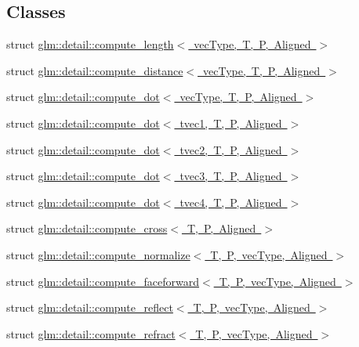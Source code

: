 \subsection*{Classes}
\begin{DoxyCompactItemize}
\item 
struct \mbox{\hyperlink{structglm_1_1detail_1_1compute__length}{glm\+::detail\+::compute\+\_\+length$<$ vec\+Type, T, P, Aligned $>$}}
\item 
struct \mbox{\hyperlink{structglm_1_1detail_1_1compute__distance}{glm\+::detail\+::compute\+\_\+distance$<$ vec\+Type, T, P, Aligned $>$}}
\item 
struct \mbox{\hyperlink{structglm_1_1detail_1_1compute__dot}{glm\+::detail\+::compute\+\_\+dot$<$ vec\+Type, T, P, Aligned $>$}}
\item 
struct \mbox{\hyperlink{structglm_1_1detail_1_1compute__dot_3_01tvec1_00_01_t_00_01_p_00_01_aligned_01_4}{glm\+::detail\+::compute\+\_\+dot$<$ tvec1, T, P, Aligned $>$}}
\item 
struct \mbox{\hyperlink{structglm_1_1detail_1_1compute__dot_3_01tvec2_00_01_t_00_01_p_00_01_aligned_01_4}{glm\+::detail\+::compute\+\_\+dot$<$ tvec2, T, P, Aligned $>$}}
\item 
struct \mbox{\hyperlink{structglm_1_1detail_1_1compute__dot_3_01tvec3_00_01_t_00_01_p_00_01_aligned_01_4}{glm\+::detail\+::compute\+\_\+dot$<$ tvec3, T, P, Aligned $>$}}
\item 
struct \mbox{\hyperlink{structglm_1_1detail_1_1compute__dot_3_01tvec4_00_01_t_00_01_p_00_01_aligned_01_4}{glm\+::detail\+::compute\+\_\+dot$<$ tvec4, T, P, Aligned $>$}}
\item 
struct \mbox{\hyperlink{structglm_1_1detail_1_1compute__cross}{glm\+::detail\+::compute\+\_\+cross$<$ T, P, Aligned $>$}}
\item 
struct \mbox{\hyperlink{structglm_1_1detail_1_1compute__normalize}{glm\+::detail\+::compute\+\_\+normalize$<$ T, P, vec\+Type, Aligned $>$}}
\item 
struct \mbox{\hyperlink{structglm_1_1detail_1_1compute__faceforward}{glm\+::detail\+::compute\+\_\+faceforward$<$ T, P, vec\+Type, Aligned $>$}}
\item 
struct \mbox{\hyperlink{structglm_1_1detail_1_1compute__reflect}{glm\+::detail\+::compute\+\_\+reflect$<$ T, P, vec\+Type, Aligned $>$}}
\item 
struct \mbox{\hyperlink{structglm_1_1detail_1_1compute__refract}{glm\+::detail\+::compute\+\_\+refract$<$ T, P, vec\+Type, Aligned $>$}}
\end{DoxyCompactItemize}
